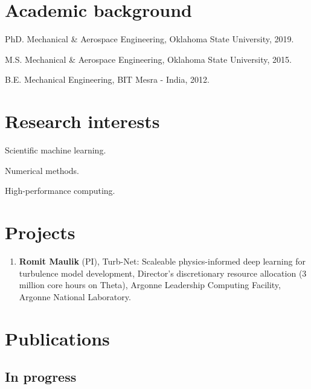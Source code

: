 \documentclass[letterpaper]{article}
\renewenvironment{itemize}{
  \begin{list}{}{
    \setlength{\leftmargin}{1.5em}
  }
}{
  \end{list}
}
\begin{document}
\section*{Academic background}

\begin{itemize}
  \item PhD. Mechanical \& Aerospace Engineering, Oklahoma State University, 2019.
  \item M.S. Mechanical \& Aerospace Engineering, Oklahoma State University, 2015.
  \item B.E. Mechanical Engineering, BIT Mesra - India, 2012. 
\end{itemize}

\section*{Research interests}

\begin{itemize}
    \item Scientific machine learning.
    \item Numerical methods.
    \item High-performance computing.
\end{itemize}

\section*{Projects}

\begin{enumerate}
    \item \textbf{Romit Maulik} (PI), Turb-Net: Scaleable physics-informed deep learning for turbulence model development, Director's discretionary resource allocation (3 million core hours on Theta), Argonne Leadership Computing Facility, Argonne National Laboratory.
\end{enumerate}

\section*{Publications}

\subsection*{In progress}
\end{document}
